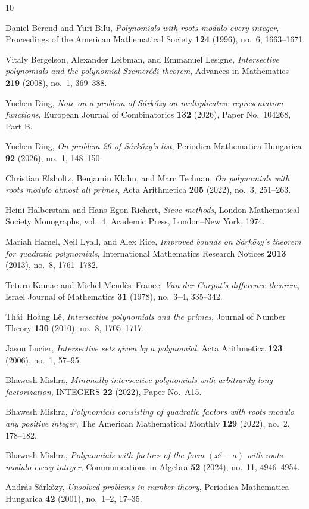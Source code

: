 \documentclass[11pt]{amsart}
\theoremstyle{definition}
\begin{document}
\begin{thebibliography}{10}

Daniel Berend and Yuri Bilu, \emph{Polynomials with roots modulo every
  integer}, Proceedings of the American Mathematical Society \textbf{124}
  (1996), no.~6, 1663--1671.

Vitaly Bergelson, Alexander Leibman, and Emmanuel Lesigne, \emph{Intersective
  polynomials and the polynomial {S}zemer{\'e}di theorem}, Advances in
  Mathematics \textbf{219} (2008), no.~1, 369--388.

Yuchen Ding, \emph{Note on a problem of {S}{\'a}rk{\H{o}}zy on multiplicative
  representation functions}, European Journal of Combinatorics \textbf{132}
  (2026), Paper No.~104268, Part B.

Yuchen Ding, \emph{On problem 26 of {S}{\'a}rk{\H{o}}zy's list}, Periodica
  Mathematica Hungarica \textbf{92} (2026), no.~1, 148--150.

Christian Elsholtz, Benjamin Klahn, and Marc Technau, \emph{On polynomials
  with roots modulo almost all primes}, Acta Arithmetica \textbf{205} (2022),
  no.~3, 251--263.

Heini Halberstam and Hans-Egon Richert, \emph{Sieve methods}, London
  Mathematical Society Monographs, vol.~4, Academic Press, London--New York,
  1974.

Mariah Hamel, Neil Lyall, and Alex Rice, \emph{Improved bounds on
  {S}{\'a}rk{\H{o}}zy's theorem for quadratic polynomials}, International
  Mathematics Research Notices \textbf{2013} (2013), no.~8, 1761--1782.

Teturo Kamae and Michel Mend{\`e}s~France, \emph{Van der {C}orput's difference
  theorem}, Israel Journal of Mathematics \textbf{31} (1978), no.~3--4,
  335--342.

Th\'ai~Ho\`ang L{\^e}, \emph{Intersective polynomials and the primes}, Journal
  of Number Theory \textbf{130} (2010), no.~8, 1705--1717.

Jason Lucier, \emph{Intersective sets given by a polynomial}, Acta Arithmetica
  \textbf{123} (2006), no.~1, 57--95.

Bhawesh Mishra, \emph{Minimally intersective polynomials with arbitrarily
  long factorization}, INTEGERS \textbf{22} (2022), Paper No.~A15.

Bhawesh Mishra, \emph{Polynomials consisting of quadratic factors with roots
  modulo any positive integer}, The American Mathematical Monthly
  \textbf{129} (2022), no.~2, 178--182.

Bhawesh Mishra, \emph{Polynomials with factors of the form \((x^q-a)\) with
  roots modulo every integer}, Communications in Algebra \textbf{52} (2024),
  no.~11, 4946--4954.

Andr{\'a}s S{\'a}rk{\H{o}}zy, \emph{Unsolved problems in number theory},
  Periodica Mathematica Hungarica \textbf{42} (2001), no.~1--2, 17--35.

\end{thebibliography}
\end{document}
